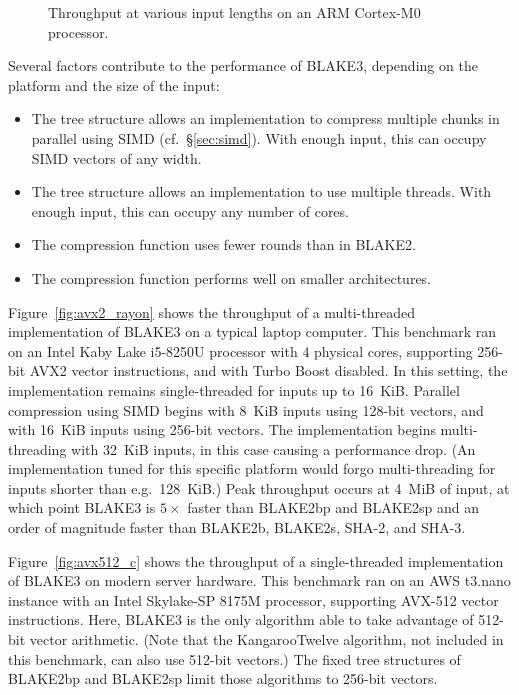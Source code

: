 \documentclass[11pt,notitlepage,a4paper]{article}
\begin{document}
\begin{figure}[h]
\centering
%

\caption{Throughput at various input lengths on an ARM Cortex-M0 processor.}%
\label{fig:rpizero}
\end{figure}

Several factors contribute to the performance of BLAKE3, depending on the
platform and the size of the input:

\begin{itemize}
    \item The tree structure allows an implementation to compress multiple
        chunks in parallel using SIMD (cf.~\S\ref{sec:simd}). With enough
        input, this can occupy SIMD vectors of any width.
    \item The tree structure allows an implementation to use multiple threads.
        With enough input, this can occupy any number of cores.
    \item The compression function uses fewer rounds than in BLAKE2.
    \item The compression function performs well on smaller architectures.
\end{itemize}

Figure~\ref{fig:avx2_rayon} shows the throughput of a multi-threaded
implementation of BLAKE3 on a typical laptop computer. This benchmark ran on an
Intel Kaby Lake i5-8250U processor with 4 physical cores, supporting 256-bit
AVX2 vector instructions, and with Turbo Boost disabled. In this setting, the
implementation remains single-threaded for inputs up to 16~KiB. Parallel
compression using SIMD begins with 8~KiB inputs using 128-bit vectors, and with
16~KiB inputs using 256-bit vectors. The implementation begins multi-threading
with 32~KiB inputs, in this case causing a performance drop. (An implementation
tuned for this specific platform would forgo multi-threading for inputs shorter
than e.g.\ 128~KiB.) Peak throughput occurs at 4~MiB of input, at which point
BLAKE3 is $5\times$ faster than BLAKE2bp and BLAKE2sp and an order of magnitude
faster than BLAKE2b, BLAKE2s, SHA-2, and SHA-3.

Figure~\ref{fig:avx512_c} shows the throughput of a single-threaded
implementation of BLAKE3 on modern server hardware. This benchmark ran on an
AWS t3.nano instance with an Intel Skylake-SP 8175M processor, supporting
AVX-512 vector instructions. Here, BLAKE3 is the only algorithm able to take
advantage of 512-bit vector arithmetic. (Note that the KangarooTwelve
algorithm, not included in this benchmark, can also use 512-bit vectors.) The
fixed tree structures of BLAKE2bp and BLAKE2sp limit those algorithms to
256-bit vectors.
\end{document}
